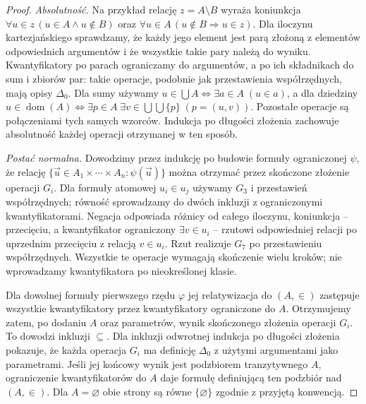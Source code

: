 \begin{proof}
\emph{Absolutność.} Na przykład relację $z=A\setminus B$
wyraża koniunkcja
$\forall u\in z\,(u\in A\land u\notin B)$ oraz
$\forall u\in A\,(u\notin B\Rightarrow u\in z)$.
Dla iloczynu kartezjańskiego sprawdzamy, że każdy jego
element jest parą złożoną z elementów odpowiednich
argumentów i że wszystkie takie pary należą do wyniku.
Kwantyfikatory po parach ograniczamy do argumentów,
a po ich składnikach do sum i zbiorów par: takie
operacje, podobnie jak przestawienia współrzędnych,
mają opisy $\Delta_0$. Dla sumy używamy
$u\in\bigcup A\iff\exists a\in A\;(u\in a)$,
a dla dziedziny
$u\in\operatorname{dom}(A)\iff
\exists p\in A\;\exists v\in\bigcup\bigcup\{p\}\;(p=(u,v))$.
Pozostałe operacje są połączeniami tych samych wzorców.
Indukcja po długości złożenia zachowuje absolutność
każdej operacji otrzymanej w ten sposób.

\emph{Postać normalna.} Dowodzimy przez indukcję po
budowie formuły ograniczonej $\psi$,
że relację
$\{\vec u\in A_1\times\cdots\times A_n:\psi(\vec u)\}$
można otrzymać przez skończone złożenie operacji
$G_i$. Dla formuły atomowej $u_i\in u_j$ używamy
$G_3$ i przestawień współrzędnych; równość sprowadzamy
do dwóch inkluzji z ograniczonymi kwantyfikatorami.
Negacja odpowiada różnicy od całego iloczynu, koniunkcja
-- przecięciu, a kwantyfikator ograniczony
$\exists v\in u_i$ -- rzutowi odpowiedniej relacji
po uprzednim przecięciu z relacją $v\in u_i$.
Rzut realizuje $G_7$ po przestawieniu współrzędnych.
Wszystkie te operacje wymagają skończenie wielu kroków;
nie wprowadzamy kwantyfikatora po nieokreślonej klasie.

Dla dowolnej formuły pierwszego rzędu $\varphi$ jej
relatywizacja do $(A,\in)$ zastępuje wszystkie
kwantyfikatory przez kwantyfikatory ograniczone do $A$.
Otrzymujemy zatem, po dodaniu $A$ oraz parametrów,
wynik skończonego złożenia operacji $G_i$.
To dowodzi inkluzji $\subseteq$.
Dla inkluzji odwrotnej indukcja po długości złożenia
pokazuje, że każda operacja $G_i$ ma definicję
$\Delta_0$ z użytymi argumentami jako parametrami.
Jeśli jej końcowy wynik jest podzbiorem tranzytywnego
$A$, ograniczenie kwantyfikatorów do $A$ daje formułę
definiującą ten podzbiór nad $(A,\in)$.
Dla $A=\varnothing$ obie strony są równe
$\{\varnothing\}$ zgodnie z przyjętą konwencją.
\end{proof}


